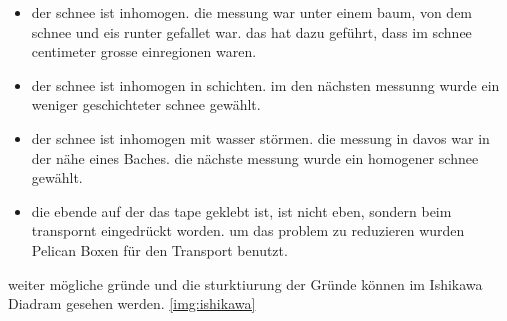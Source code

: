 \begin{itemize}
\item der schnee ist inhomogen. die messung war unter einem baum, von dem schnee und eis runter gefallet war. das hat dazu geführt, dass im schnee centimeter grosse einregionen waren.
\item der schnee ist inhomogen in schichten. im den nächsten messunng wurde ein weniger geschichteter schnee gewählt.
\item der schnee ist inhomogen mit wasser störmen. die messung in davos war in der nähe eines Baches. die nächste messung wurde ein homogener schnee gewählt.
\item die ebende auf der das tape geklebt ist, ist nicht eben, sondern beim transpornt eingedrückt worden. um das problem zu reduzieren wurden Pelican Boxen für den Transport benutzt.
\end{itemize}

weiter mögliche gründe und die sturktiurung der Gründe können im Ishikawa Diadram gesehen werden. \ref{img:ishikawa}
